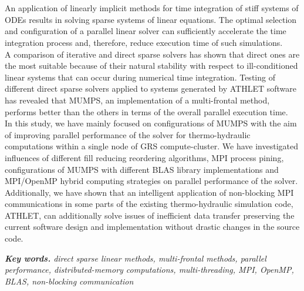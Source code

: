 \chapter{\abstractname}

An application of linearly implicit methods for time integration of stiff systems of ODEs  results in solving sparse systems of linear equations. The optimal selection and configuration of a parallel linear solver can sufficiently accelerate the time integration process and, therefore, reduce execution time of such simulations.\\



A comparison of iterative and direct sparse solvers has shown that direct ones are the most suitable because of their natural stability with respect to ill-conditioned linear systems that can occur during numerical time integration. Testing of different direct sparse solvers applied to systems generated by ATHLET software has revealed that MUMPS, an implementation of a multi-frontal method, performs better than the others in terms of the overall parallel execution time.\\


In this study, we have mainly focused on configurations of MUMPS with the aim of improving parallel performance of the solver for thermo-hydraulic computations within a single node of GRS compute-cluster. We have investigated influences of  different fill reducing reordering algorithms, MPI process pining, configurations of MUMPS with different BLAS library implementations and MPI/OpenMP hybrid computing strategies on parallel performance of the solver.\\


Additionally, we have shown that an intelligent application of non-blocking MPI communications in some parts of the existing thermo-hydraulic simulation code, ATHLET, can additionally solve issues of inefficient data transfer preserving the current software design and implementation without drastic changes in the source code.\\

\vspace{20mm}

\textit{\textbf{Key words.} direct sparse linear methods, multi-frontal methods, parallel performance, distributed-memory computations,  multi-threading, MPI, OpenMP, BLAS, non-blocking communication}